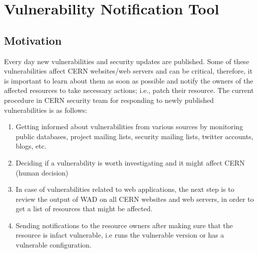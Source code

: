 \chapter{Vulnerability Notification Tool}
\label{chap5-vulnerability-notification-tool}
\thispagestyle{empty}

\section{Motivation}

Every day new vulnerabilities and security updates are published. Some of these vulnerabilities affect CERN websites/web servers and can be critical, therefore, it is important to learn about them as soon as possible and notify the owners of the affected resources to take necessary actions; i.e., patch their resource. The current procedure in CERN security team for responding to newly published vulnerabilities is as follows:
\begin{enumerate}
\item Getting informed about vulnerabilities from various sources by monitoring public databases, project mailing lists, security mailing lists, twitter accounts, blogs, etc.
\item Deciding if a vulnerability is worth investigating and it might affect CERN (human decision)
\item In case of vulnerabilities related to web applications, the next step is to review the output of WAD on all CERN websites and web servers, in order to get a list of resources that might be affected.
\item Sending notifications to the resource owners after making sure that the resource is infact vulnerable, i.e runs the vulnerable version or has a vulnerable configuration.
\end{enumerate}

